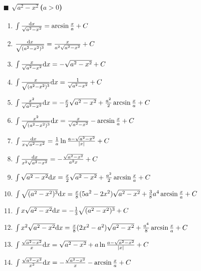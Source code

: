 \paragraph{$\blacksquare$ $\sqrt{a^2-x^2}$($a>0$)}

\begin{enumerate}

\item $ \int \frac{\mathrm{d} x}{\sqrt{a^2-x^2}} = \arcsin \frac{x}{a} + C $

\item $ \frac{\mathrm{d} x}{\sqrt{(a^2-x^2)^3}} = \frac{x}{a^2\sqrt{a^2-x^2}} + C $

\item $ \int \frac{x}{\sqrt{a^2-x^2}} \mathrm{d} x = -\sqrt{a^2-x^2} + C $

\item $ \int \frac{x}{\sqrt{(a^2-x^2)^3}} \mathrm{d} x = \frac{1}{\sqrt{a^2-x^2}} + C $

\item $ \int \frac{x^2}{\sqrt{a^2-x^2}} \mathrm{d} x = -\frac{x}{2}\sqrt{a^2-x^2} + \frac{a^2}{2}\arcsin\frac{x}{a} + C $

\item $ \int \frac{x^2}{\sqrt{(a^2-x^2)^3}} \mathrm{d} x = \frac{x}{\sqrt{a^2-x^2}} - \arcsin\frac{x}{a} + C $

\item $ \int \frac{\mathrm{d} x}{x\sqrt{a^2-x^2}} = \frac{1}{a}\ln\frac{a-\sqrt{a^2-x^2}}{|x|} + C$

\item $ \int \frac{\mathrm{d} x}{x^2\sqrt{a^2-x^2}} = -\frac{\sqrt{a^2-x^2}}{a^2x} + C $

\item $ \int \sqrt{a^2-x^2}\mathrm{d} x = \frac{x}{2}\sqrt{a^2-x^2} + \frac{a^2}{2}\arcsin\frac{x}{a} + C $

\item $ \int \sqrt{(a^2-x^2)^3}\mathrm{d} x = \frac{x}{8}(5a^2-2x^2)\sqrt{a^2-x^2}+\frac{3}{8}a^4\arcsin\frac{x}{a} + C $

\item $ \int x\sqrt{a^2-x^2}\mathrm{d} x = -\frac{1}{3}\sqrt{(a^2-x^2)^3} + C $

\item $ \int x^2\sqrt{a^2-x^2}\mathrm{d} x = \frac{x}{8}(2x^2-a^2)\sqrt{a^2-x^2}+\frac{a^4}{8}\arcsin\frac{x}{a} + C $

\item $ \int \frac{\sqrt{a^2-x^2}}{x}\mathrm{d} x = \sqrt{a^2-x^2} + a \ln \frac{a-\sqrt{a^2-x^2}}{|x|} + C $

\item $ \int \frac{\sqrt{a^2-x^2}}{x^2} \mathrm{d} x = -\frac{\sqrt{a^2-x^2}}{x} - \arcsin\frac{x}{a} + C $

\end{enumerate}

